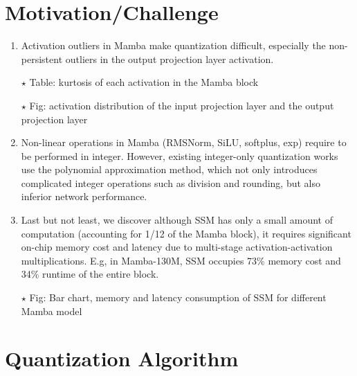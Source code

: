 \section*{Motivation/Challenge}
\begin{enumerate}

    \item Activation outliers in Mamba make quantization difficult, especially the non-persistent outliers in the output projection layer activation.
    
    $\star$ Table: kurtosis of each activation in the Mamba block
    
    $\star$ Fig: activation distribution of the input projection layer and the output projection layer

    \item Non-linear operations in Mamba (RMSNorm, SiLU, softplus, exp) require to be performed in integer.
    However, existing integer-only quantization works use the polynomial approximation method, which not only introduces complicated integer operations such as division and rounding, but also inferior network performance.
    
    \item Last but not least, we discover although SSM has only a small amount of computation (accounting for 1/12 of the Mamba block), it requires significant on-chip memory cost and latency due to multi-stage activation-activation multiplications. E.g, in Mamba-130M, SSM occupies 73\% memory cost and 34\% runtime of the entire block.
        
    $\star$ Fig: Bar chart, memory and latency consumption of SSM for different Mamba model
    



\end{enumerate}


\section*{Quantization Algorithm}

